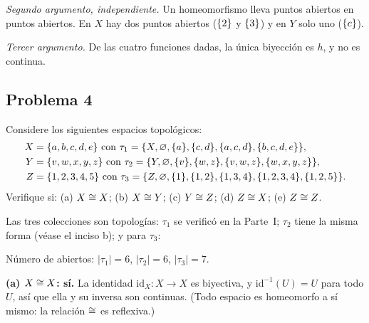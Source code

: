 \emph{Segundo argumento, independiente.} Un homeomorfismo lleva puntos abiertos en puntos abiertos. En $X$ hay dos
puntos abiertos ($\{2\}$ y $\{3\}$) y en $Y$ solo uno ($\{c\}$).

\emph{Tercer argumento.} De las cuatro funciones dadas, la única biyección es $h$, y no es continua.


\subsection{Problema 4}
\begin{enunciado}
Considere los siguientes espacios topológicos:
\begin{align*}
X&=\{a,b,c,d,e\} \text{ con } \tau_1=\{X,\varnothing,\{a\},\{c,d\},\{a,c,d\},\{b,c,d,e\}\},\\
Y&=\{v,w,x,y,z\} \text{ con } \tau_2=\{Y,\varnothing,\{v\},\{w,z\},\{v,w,z\},\{w,x,y,z\}\},\\
Z&=\{1,2,3,4,5\} \text{ con } \tau_3=\{Z,\varnothing,\{1\},\{1,2\},\{1,3,4\},\{1,2,3,4\},\{1,2,5\}\}.
\end{align*}
Verifique si: (a) $X\cong X$; (b) $X\cong Y$; (c) $Y\cong Z$; (d) $Z\cong X$; (e) $Z\cong Z$.
\end{enunciado}
Las tres colecciones son topologías: $\tau_1$ se verificó en la Parte~I; $\tau_2$ tiene la misma forma (véase el
inciso b); y para $\tau_3$:
\begin{center}{\scriptsize\renewcommand{\arraystretch}{1.2}\setlength{\tabcolsep}{3.5pt}\qquad}\end{center}
Número de abiertos: $|\tau_1|=6$, $|\tau_2|=6$, $|\tau_3|=7$.

\textbf{(a) $X\cong X$: sí.} La identidad $\mathrm{id}_X:X\to X$ es biyectiva, y $\mathrm{id}^{-1}(U)=U$ para todo
$U$, así que ella y su inversa son continuas. (Todo espacio es homeomorfo a sí mismo: la relación $\cong$ es
reflexiva.)

